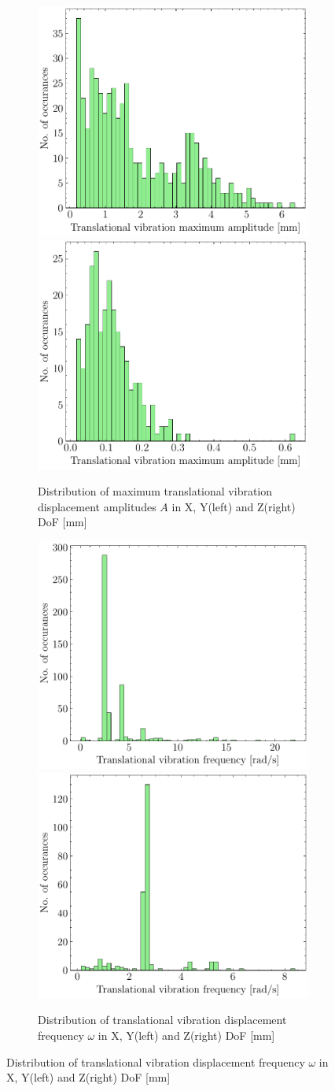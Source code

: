 \begin{figure}[H]
    \begin{subfigure}{\linewidth}
    \includegraphics[width=.5\linewidth]{images/fig_chapter4/data_dist/1.pdf}\hfill
    \includegraphics[width=.5\linewidth]{images/fig_chapter4/data_dist/2.pdf}
    \caption{Distribution of maximum translational vibration displacement amplitudes $ A $ in X, Y(left) and Z(right) DoF [mm]}
    \end{subfigure}\par\medskip
    
    \begin{subfigure}{\linewidth}
    \includegraphics[width=.5\linewidth]{images/fig_chapter4/data_dist/3.pdf}\hfill
    \includegraphics[width=.5\linewidth]{images/fig_chapter4/data_dist/4.pdf}
    \caption{Distribution of translational vibration displacement frequency $ \omega $ in X, Y(left) and Z(right) DoF [mm]}
    \end{subfigure}\par\medskip
    

\end{figure}
